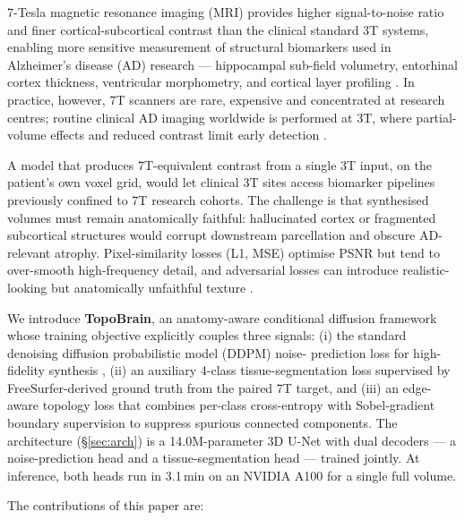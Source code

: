 \documentclass[10pt,twocolumn,a4paper]{article}
\begin{document}
7-Tesla magnetic resonance imaging (MRI) provides higher signal-to-noise
ratio and finer cortical-subcortical contrast than the clinical
standard 3T systems, enabling more sensitive measurement of structural
biomarkers used in Alzheimer's disease (AD) research --- hippocampal
sub-field volumetry, entorhinal cortex thickness, ventricular morphometry,
and cortical layer profiling
\cite{wisse2014hippo,deflores2020hippocampal,yushkevich2015subfields}. In
practice, however, 7T scanners are rare, expensive and concentrated at
research centres; routine clinical AD imaging worldwide is performed at
3T, where partial-volume effects and reduced contrast limit early
detection
\cite{frisoni2010clinical,jack2018niaaa}.

A model that produces 7T-equivalent contrast from a single 3T input, on
the patient's own voxel grid, would let clinical 3T sites access
biomarker pipelines previously confined to 7T research cohorts. The
challenge is that synthesised volumes must remain anatomically faithful:
hallucinated cortex or fragmented subcortical structures would corrupt
downstream parcellation and obscure AD-relevant atrophy. Pixel-similarity
losses (L1, MSE) optimise PSNR but tend to over-smooth high-frequency
detail, and adversarial losses can introduce realistic-looking but
anatomically unfaithful texture
\cite{blau2018perception,isola2017image,zhu2017unpaired}.

We introduce \textbf{TopoBrain}, an anatomy-aware conditional diffusion
framework whose training objective explicitly couples three signals:
(i) the standard denoising diffusion probabilistic model (DDPM) noise-
prediction loss for high-fidelity synthesis
\cite{ho2020denoising}, (ii) an auxiliary 4-class tissue-segmentation
loss supervised by FreeSurfer-derived ground truth from the paired 7T
target, and (iii) an edge-aware topology loss that combines per-class
cross-entropy with Sobel-gradient boundary supervision to suppress
spurious connected components. The architecture (\S\ref{sec:arch}) is a
14.0M-parameter 3D U-Net with dual decoders --- a noise-prediction head
and a tissue-segmentation head --- trained jointly. At inference, both
heads run in 3.1\,min on an NVIDIA A100 for a single full volume.

The contributions of this paper are:
\end{document}
